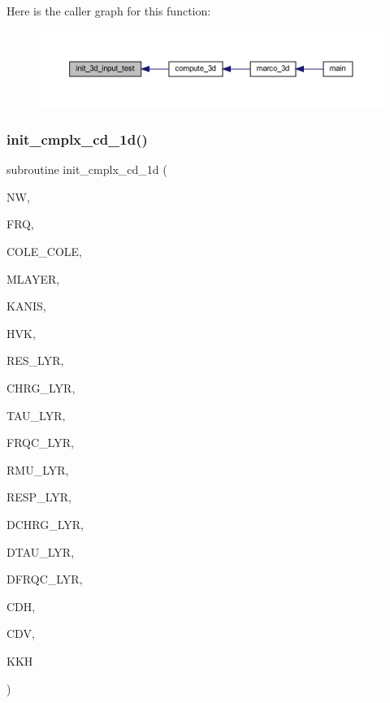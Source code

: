 Here is the caller graph for this function\+:
\nopagebreak
\begin{figure}[H]
\begin{center}
\leavevmode
\includegraphics[width=350pt]{Marco_8f90_afdb11dbe2b5041f4f314349b7334b974_icgraph}
\end{center}
\end{figure}
\mbox{\label{Marco_8f90_ab5e1d6b86ed64b774c25c5b69552f078}} 
\subsubsection{\texorpdfstring{init\+\_\+cmplx\+\_\+cd\+\_\+1d()}{init\_cmplx\_cd\_1d()}}
{\footnotesize\ttfamily subroutine init\+\_\+cmplx\+\_\+cd\+\_\+1d (\begin{DoxyParamCaption}\item[{integer}]{NW,  }\item[{real}]{F\+RQ,  }\item[{integer}]{C\+O\+L\+E\+\_\+\+C\+O\+LE,  }\item[{integer}]{M\+L\+A\+Y\+ER,  }\item[{integer}]{K\+A\+N\+IS,  }\item[{real, dimension(0\+:mlayer)}]{H\+VK,  }\item[{real, dimension(mlayer)}]{R\+E\+S\+\_\+\+L\+YR,  }\item[{real, dimension(mlayer)}]{C\+H\+R\+G\+\_\+\+L\+YR,  }\item[{real, dimension(mlayer)}]{T\+A\+U\+\_\+\+L\+YR,  }\item[{real, dimension(mlayer)}]{F\+R\+Q\+C\+\_\+\+L\+YR,  }\item[{real, dimension(mlayer)}]{R\+M\+U\+\_\+\+L\+YR,  }\item[{real, dimension(mlayer)}]{R\+E\+S\+P\+\_\+\+L\+YR,  }\item[{real, dimension(mlayer)}]{D\+C\+H\+R\+G\+\_\+\+L\+YR,  }\item[{real, dimension(mlayer)}]{D\+T\+A\+U\+\_\+\+L\+YR,  }\item[{real, dimension(mlayer)}]{D\+F\+R\+Q\+C\+\_\+\+L\+YR,  }\item[{complex, dimension(0\+:mlayer)}]{C\+DH,  }\item[{complex, dimension(0\+:mlayer)}]{C\+DV,  }\item[{complex, dimension(0\+:mlayer)}]{K\+KH }\end{DoxyParamCaption})}

